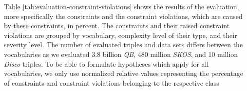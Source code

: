 \documentclass{llncs}
\newcommand{\tb}[1]{\todo[size=\small, color=green!40]{\textbf{Thomas:} #1}}
\begin{document}
{{%
Table \ref{tab:evaluation-constraint-violations} shows the results of the evaluation, more specifically the constraints and the constraint violations, which are caused by these constraints, in percent.
The constraints and their raised constraint violations are grouped by vocabulary, complexity level of their type, and their severity level.
The number of evaluated triples and data sets differs between the vocabularies
as we evaluated 3.8 billion \emph{QB}, 480 million \emph{SKOS}, and 10 million \emph{Disco} triples.
To be able to formulate hypotheses which apply for all vocabularies, 
we only use normalized relative values representing the percentage of constraints and constraint violations belonging to the respective class


}}
\end{document}
